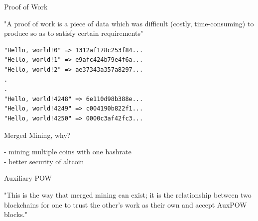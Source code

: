 \documentclass{beamer}
\begin{document}
\begin{frame}[fragile]

    {\LARGE Proof of Work}\\

    \vspace{5mm}

    "A proof of work is a piece of data which was difficult (costly, time-consuming) to produce so as to satisfy certain requirements"\\

    \vspace{5mm}

    \begin{verbatim}
"Hello, world!0" => 1312af178c253f84...
"Hello, world!1" => e9afc424b79e4f6a...
"Hello, world!2" => ae37343a357a8297...
.
.
"Hello, world!4248" => 6e110d98b388e...
"Hello, world!4249" => c004190b822f1...
"Hello, world!4250" => 0000c3af42fc3...
    \end{verbatim}

\end{frame}

\begin{frame}

    {\LARGE Merged Mining, why?}\\

    \vspace{5mm}

    - mining multiple coins with one hashrate\\
    - better security of altcoin\\

\end{frame}

\begin{frame}

    {\LARGE Auxiliary POW}\\

    \vspace{5mm}

    "This is the way that merged mining can exist; it is the relationship between two blockchains for one to trust the other's work as their own and accept AuxPOW blocks."\\

\end{frame}
\end{document}
